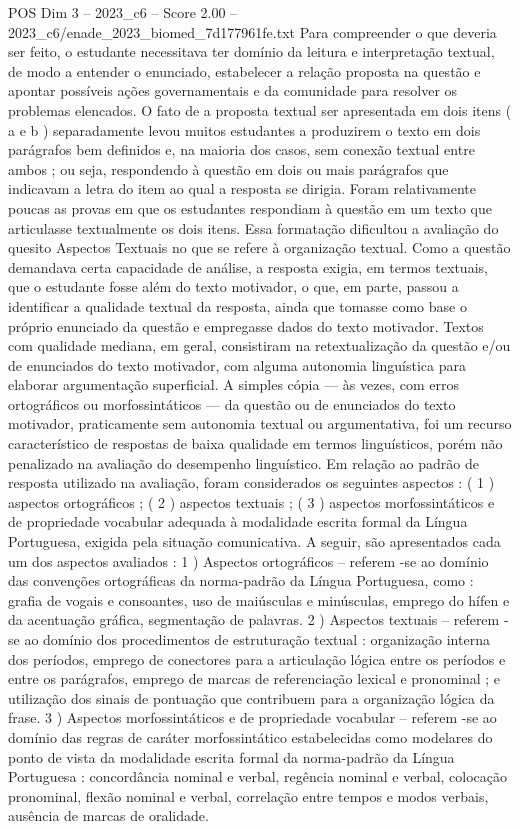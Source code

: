 \begin{textsample}{POS Dim 3 – 2023\_c6 – Score 2.00 – 2023\_c6/enade\_2023\_biomed\_7d177961fe.txt}
Para compreender o que deveria ser feito, o estudante necessitava ter domínio da leitura e interpretação textual, de modo a entender o enunciado, estabelecer a relação proposta na questão e apontar possíveis ações governamentais e da comunidade para resolver os problemas elencados.
O fato de a proposta textual ser apresentada em dois itens ( a e b ) separadamente levou muitos estudantes a produzirem o texto em dois parágrafos bem definidos e, na maioria dos casos, sem conexão textual entre ambos ; ou seja, respondendo à questão em dois ou mais parágrafos que indicavam a letra do item ao qual a resposta se dirigia.
Foram relativamente poucas as provas em que os estudantes respondiam à questão em um texto que articulasse textualmente os dois itens.
Essa formatação dificultou a avaliação do quesito Aspectos Textuais no que se refere à organização textual.
Como a questão demandava certa capacidade de análise, a resposta exigia, em termos textuais, que o estudante fosse além do texto motivador, o que, em parte, passou a identificar a qualidade textual da resposta, ainda que tomasse como base o próprio enunciado da questão e empregasse dados do texto motivador.
Textos com qualidade mediana, em geral, consistiram na retextualização da questão e/ou de enunciados do texto motivador, com alguma autonomia linguística para elaborar argumentação superficial.
A simples cópia — às vezes, com erros ortográficos ou morfossintáticos — da questão ou de enunciados do texto motivador, praticamente sem autonomia textual ou argumentativa, foi um recurso característico de respostas de baixa qualidade em termos linguísticos, porém não penalizado na avaliação do desempenho linguístico.
Em relação ao padrão de resposta utilizado na avaliação, foram considerados os seguintes aspectos : ( 1 ) aspectos ortográficos ; ( 2 ) aspectos textuais ; ( 3 ) aspectos morfossintáticos e de propriedade vocabular adequada à modalidade escrita formal da Língua Portuguesa, exigida pela situação comunicativa.
A seguir, são apresentados cada um dos aspectos avaliados : 1 ) Aspectos ortográficos – referem -se ao domínio das convenções ortográficas da norma-padrão da Língua Portuguesa, como : grafia de vogais e consoantes, uso de maiúsculas e minúsculas, emprego do hífen e da acentuação gráfica, segmentação de palavras. 2 ) Aspectos textuais – referem -se ao domínio dos procedimentos de estruturação textual : organização interna dos períodos, emprego de conectores para a articulação lógica entre os períodos e entre os parágrafos, emprego de marcas de referenciação lexical e pronominal ; e utilização dos sinais de pontuação que contribuem para a organização lógica da frase. 3 ) Aspectos morfossintáticos e de propriedade vocabular – referem -se ao domínio das regras de caráter morfossintático estabelecidas como modelares do ponto de vista da modalidade escrita formal da norma-padrão da Língua Portuguesa : concordância nominal e verbal, regência nominal e verbal, colocação pronominal, flexão nominal e verbal, correlação entre tempos e modos verbais, ausência de marcas de oralidade.

\end{textsample}
